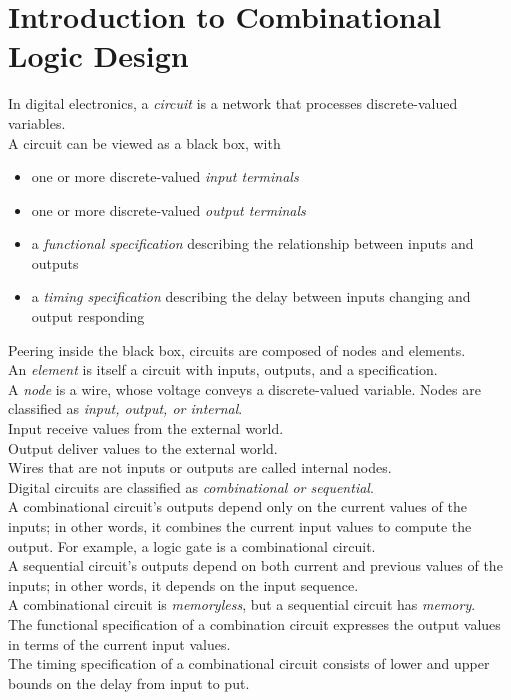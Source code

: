\documentclass[12pt]{article}
\theoremstyle{definition}
\begin{document}
  \section{Introduction to Combinational Logic Design}
  In digital electronics, a \emph{circuit} is a network that processes discrete-valued variables. \\
  A circuit can be viewed as a black box, with
  \begin{itemize}
    \item one or more discrete-valued \emph{input terminals}
    \item one or more discrete-valued \emph{output terminals}
    \item a \emph{functional specification} describing the relationship between inputs and outputs
    \item a \emph{timing specification} describing the delay between inputs changing and output responding
  \end{itemize}
  Peering inside the black box, circuits are composed of nodes and elements. \\
  An \emph{element} is itself a circuit with inputs, outputs, and a specification. \\
  A \emph{node} is a wire, whose voltage conveys a discrete-valued variable.
  Nodes are classified as \emph{input, output, \emph{or} internal}. \\
  Input receive values from the external world. \\
  Output deliver values to the external world. \\
  Wires that are not inputs or outputs are called internal nodes. \\

  Digital circuits are classified as \emph{combinational \emph{or} sequential}. \\
  A combinational circuit's outputs depend only on the current values of the inputs; in other words, it combines the current input values to compute the output.
  For example, a logic gate is a combinational circuit. \\
  A sequential circuit's outputs depend on both current and previous values of the inputs; in other words, it depends on the input sequence. \\
  A combinational circuit is \emph{memoryless}, but a sequential circuit has \emph{memory}. \\

  The functional specification of a combination circuit expresses the output values in terms of the current input values. \\
  The timing specification of a combinational circuit consists of lower and upper bounds on the delay from input to put. \\
\end{document}
